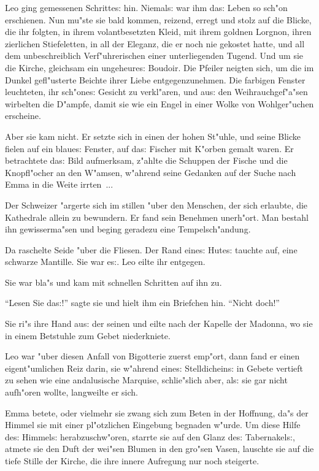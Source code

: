 \documentclass[oneside,12pt]{book}
\newcommand{\s}{s:}%
\begin{document}
Leo ging gemessenen Schritte{\s} hin. Niemal{\s} war ihm da{\s}
Leben so sch"on erschienen. Nun mu"ste sie bald kommen, reizend,
erregt und stolz auf die Blicke, die ihr folgten, in ihrem
volantbesetzten Kleid, mit ihrem goldnen Lorgnon, ihren zierlichen
Stiefeletten, in all der Eleganz, die er noch nie gekostet hatte,
und all dem unbeschreiblich Verf"uhrerischen einer unterliegenden
Tugend. Und um sie die Kirche, gleichsam ein ungeheure{\s}
Boudoir. Die Pfeiler neigten sich, um die im Dunkel gefl"usterte
Beichte ihrer Liebe entgegenzunehmen. Die farbigen Fenster
leuchteten, ihr sch"one{\s} Gesicht zu verkl"aren, und au{\s} den
Weihrauchgef"a"sen wirbelten die D"ampfe, damit sie wie ein Engel
in einer Wolke von Wohlger"uchen erscheine.

Aber sie kam nicht. Er setzte sich in einen der hohen St"uhle, und
seine Blicke fielen auf ein blaue{\s} Fenster, auf da{\s} Fischer
mit K"orben gemalt waren. Er betrachtete da{\s} Bild aufmerksam,
z"ahlte die Schuppen der Fische und die Knopfl"ocher an den
W"amsen, w"ahrend seine Gedanken auf der Suche nach Emma in die
Weite irrten~...

Der Schweizer "argerte sich im stillen "uber den Menschen, der
sich erlaubte, die Kathedrale allein zu bewundern. Er fand sein
Benehmen unerh"ort. Man bestahl ihn gewisserma"sen und beging
geradezu eine Tempelsch"andung.

Da raschelte Seide "uber die Fliesen. Der Rand eine{\s} Hute{\s}
tauchte auf, eine schwarze Mantille. Sie war e{\s}. Leo eilte ihr
entgegen.

Sie war bla"s und kam mit schnellen Schritten auf ihn zu.

"`Lesen Sie da{\s}!"' sagte sie und hielt ihm ein Briefchen hin.
"`Nicht doch!"'

Sie ri"s ihre Hand au{\s} der seinen und eilte nach der Kapelle
der Madonna, wo sie in einem Betstuhle zum Gebet niederkniete.

Leo war "uber diesen Anfall von Bigotterie zuerst emp"ort, dann
fand er einen eigent"umlichen Reiz darin, sie w"ahrend eine{\s}
Stelldichein{\s} in Gebete vertieft zu sehen wie eine andalusische
Marquise, schlie"slich aber, al{\s} sie gar nicht aufh"oren
wollte, langweilte er sich.

Emma betete, oder vielmehr sie zwang sich zum Beten in der
Hoffnung, da"s der Himmel sie mit einer pl"otzlichen Eingebung
begnaden w"urde. Um diese Hilfe de{\s} Himmel{\s} herabzuschw"oren,
starrte sie auf den Glanz de{\s} Tabernakel{\s}, atmete sie den
Duft der wei"sen Blumen in den gro"sen Vasen, lauschte sie auf die
tiefe Stille der Kirche, die ihre innere Aufregung nur noch
steigerte.
\end{document}
